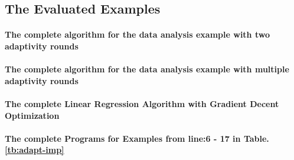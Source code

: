  \subsection{The Evaluated Examples}  
 \paragraph{The complete algorithm for the data analysis example with two adaptivity rounds} 
 
 \paragraph{The complete algorithm for the data analysis example with multiple adaptivity rounds} 
 
\paragraph{The complete Linear Regression Algorithm with Gradient Decent Optimization}

\paragraph*{The complete Programs for Examples from line:6 - 17 in Table.\ref{tb:adapt-imp}}
